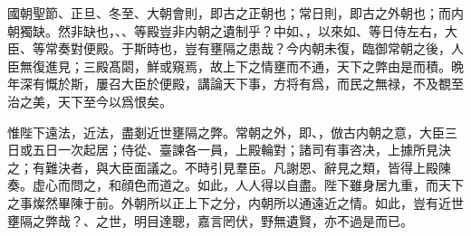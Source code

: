國朝聖節、正旦、冬至、大朝會則，即古之正朝也；常日則，即古之外朝也；而内朝獨缺。然非缺也，、、等殿豈非内朝之遺制乎？中如、，以來如、等日侍左右，大臣、等常奏對便殿。于斯時也，豈有壅隔之患哉？今内朝未復，臨御常朝之後，人臣無復進見；三殿髙閟，鮮或窺焉，故上下之情壅而不通，天下之弊由是而積。晩年深有慨於斯，屢召大臣於便殿，講論天下事，{方将}有爲，而民之無禄，不及覩至治之美，天下至今以爲恨矣。%

惟陛下遠法，近法，盡剗近世壅隔之弊。常朝之外，即、，倣古内朝之意，大臣三日或五日一次起居；侍從、臺諫各一員，上殿輪對；諸司有事咨决，上據所見決之；有難決者，與大臣面議之。不時引見羣臣。凡謝恩、辭見之類，皆得上殿陳奏。虚心而問之，和顔色而道之。如此，人人得以自盡。陛下雖身居九重，而天下之事燦然畢陳于前。外朝所以正上下之分，内朝所以通遠近之情。如此，豈有近世壅隔之弊哉？、之世，明目達聰，嘉言罔伏，野無遺賢，亦不過是而已。%

\theendnotes


